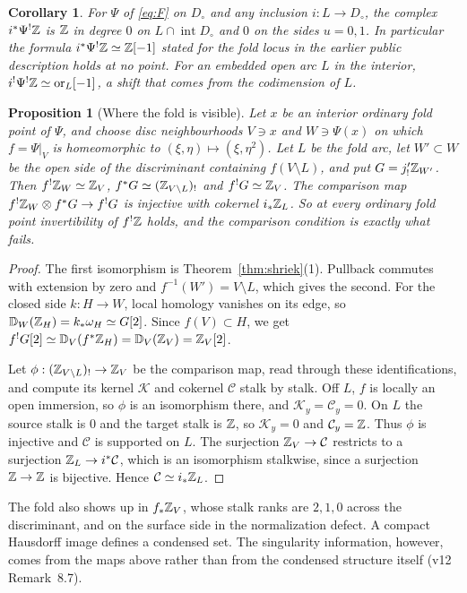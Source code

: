 \documentclass[11pt]{article}
\newtheorem{proposition}[theorem]{Proposition}
\newtheorem{corollary}[theorem]{Corollary}
\theoremstyle{definition}\newtheorem{definition}[theorem]{Definition}
\theoremstyle{remark}\newtheorem{remark}[theorem]{Remark}
\newcommand{\inte}{\operatorname{int}}\newcommand{\orr}{\mathrm{or}}
\begin{document}
\begin{corollary}\label{cor:shift}
For $\Psi$ of \eqref{eq:F} on $D_\circ$ and any inclusion $i:L\to D_\circ$, the
complex $i^*\Psi^!\mathbb Z$ is $\mathbb Z$ in degree $0$ on $L\cap\inte D_\circ$ and $0$ on
the sides $u=0,1$. In particular the formula $i^*\Psi^!\mathbb Z\simeq\mathbb Z[-1]$ stated
for the fold locus in the earlier public description holds at no point. For an
embedded open arc $L$ in the interior, $i^!\Psi^!\Z\simeq\orr_L[-1]$, a shift that
comes from the codimension of $L$.
\end{corollary}

\begin{proposition}[Where the fold is visible]\label{prop:detect}
Let $x$ be an interior ordinary fold point of $\Psi$, and choose disc
neighbourhoods $V\ni x$ and $W\ni\Psi(x)$ on which $f=\Psi|_V$ is homeomorphic
to $(\xi,\eta)\mapsto(\xi,\eta^2)$. Let $L$ be the fold arc, let $W'\subset W$
be the open side of the discriminant containing $f(V\setminus L)$, and put
$G=j'_!\mathbb Z_{W'}$. Then $f^!\mathbb Z_W\simeq\mathbb Z_V$, $f^*G\simeq(\mathbb Z_{V\setminus L})_!$ and
$f^!G\simeq\mathbb Z_V$. The comparison map $f^!\mathbb Z_W\otimes f^*G\to f^!G$ is injective
with cokernel $i_*\mathbb Z_L$. So at every ordinary fold point invertibility of
$f^!\mathbb Z$ holds, and the comparison condition is exactly what fails.
\end{proposition}
\begin{proof}
The first isomorphism is Theorem~\ref{thm:shriek}(1). Pullback commutes with
extension by zero and $f^{-1}(W')=V\setminus L$, which gives the second. For
the closed side $k:H\to W$, local homology vanishes on its edge, so
$\mathbb D_W(\mathbb Z_H)=k_*\omega_H\simeq G[2]$. Since $f(V)\subset H$, we get
$f^!G[2]\simeq\mathbb D_V(f^*\mathbb Z_H)=\mathbb D_V(\mathbb Z_V)=\mathbb Z_V[2]$.

Let $\phi:(\mathbb Z_{V\setminus L})_!\to\mathbb Z_V$ be the comparison map, read through
these identifications, and compute its kernel $\mathcal K$ and cokernel
$\mathcal C$ stalk by stalk. Off $L$, $f$ is locally an open immersion, so
$\phi$ is an isomorphism there, and $\mathcal K_y=\mathcal C_y=0$. On $L$ the
source stalk is $0$ and the target stalk is $\mathbb Z$, so $\mathcal K_y=0$ and
$\mathcal C_y=\mathbb Z$. Thus $\phi$ is injective and $\mathcal C$ is supported on
$L$. The surjection $\mathbb Z_V\to\mathcal C$ restricts to a surjection
$\mathbb Z_L\to i^*\mathcal C$, which is an isomorphism stalkwise, since a surjection
$\mathbb Z\to\mathbb Z$ is bijective. Hence $\mathcal C\simeq i_*\mathbb Z_L$.
\end{proof}
The fold also shows up in $f_*\mathbb Z_V$, whose stalk ranks are $2,1,0$ across the
discriminant, and on the surface side in the normalization defect. A compact
Hausdorff image defines a condensed set. The singularity information, however,
comes from the maps above rather than from the condensed structure itself
(v12 Remark~8.7).
\end{document}
